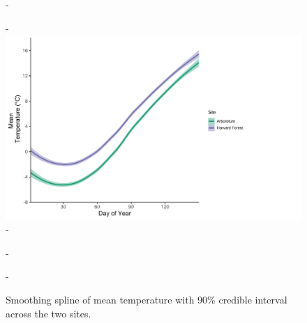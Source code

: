 \documentclass{article}\usepackage[]{graphicx}\usepackage[]{color}
\begin{document}
{\begin{figure} [H]
  -\begin{center}
  -\includegraphics[width=12cm]{..//analyses/figures/climate_hfandts.pdf}
  -\caption{Smoothing spline of mean temperature with 90\% credible interval across the two sites.}\label{fig:clim}
  -\end{center}
  -\end{figure}}
  
\end{document}
